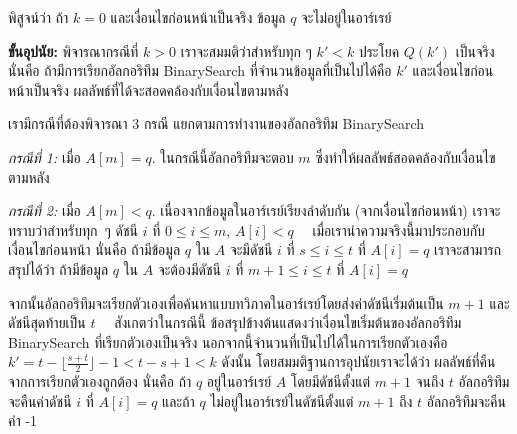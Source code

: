 \begin{quiz}{}
\label{quiz:rec-bin-basis}
พิสูจน์{\wbr}ว่า ถ้า $k=0$ และ{\wbr}เงื่อนไข{\wbr}ก่อนหน้า{\wbr}เป็นจริง ข้อมูล $q$ จะ{\wbr}ไม่{\wbr}อยู่{\wbr}ใน{\wbr}อาร์เรย์
\end{quiz}

{\bf ขั้น{\wbr}อุปนัย:} พิจารณา{\wbr}กรณี{\wbr}ที่ $k>0$ เรา{\wbr}จะ{\wbr}สมมติ{\wbr}ว่า{\wbr}สำหรับ{\wbr}ทุก ๆ $k'<k$ ประโยค{\wbr}
$Q(k')$ เป็นจริง นั่น{\wbr}คือ ถ้า{\wbr}มี{\wbr}การ{\wbr}เรียก{\wbr}อัล{\wbr}กอ{\wbr}ริ{\wbr}ทึม BinarySearch
ที่{\wbr}จำนวน{\wbr}ข้อมูล{\wbr}ที่{\wbr}เป็น{\wbr}ไป{\wbr}ได้{\wbr}คือ $k'$ และ{\wbr}เงื่อนไข{\wbr}ก่อนหน้า{\wbr}เป็นจริง{\wbr}
ผลลัพธ์{\wbr}ที่{\wbr}ได้{\wbr}จะ{\wbr}สอดคล้อง{\wbr}กับ{\wbr}เงื่อนไข{\wbr}ตาม{\wbr}หลัง{\wbr}

เรา{\wbr}มี{\wbr}กรณี{\wbr}ที่{\wbr}ต้อง{\wbr}พิจารณา 3 กรณี แยก{\wbr}ตาม{\wbr}การ{\wbr}ทำงาน{\wbr}ของ{\wbr}อัล{\wbr}กอ{\wbr}ริ{\wbr}ทึม BinarySearch

{\em กรณี{\wbr}ที่ 1:} เมื่อ $A[m]=q$. ใน{\wbr}กรณี{\wbr}นี้{\wbr}อัล{\wbr}กอ{\wbr}ริ{\wbr}ทึม{\wbr}จะ{\wbr}ตอบ $m$
ซึ่ง{\wbr}ทำ{\wbr}ให้{\wbr}ผลลัพธ์{\wbr}สอดคล้อง{\wbr}กับ{\wbr}เงื่อนไข{\wbr}ตาม{\wbr}หลัง{\wbr}

{\em กรณี{\wbr}ที่ 2:} เมื่อ $A[m]<q$. เนื่องจาก{\wbr}ข้อมูล{\wbr}ใน{\wbr}อาร์เรย์{\wbr}เรียงลำดับ{\wbr}กัน{\wbr}
(จาก{\wbr}เงื่อนไข{\wbr}ก่อนหน้า) เรา{\wbr}จะ{\wbr}ทราบ{\wbr}ว่า{\wbr}สำหรับ{\wbr}ทุก~ๆ ดัชนี $i$ ที่ $0\leq i\leq m$,
$A[i]<q$ \ \ เมื่อ{\wbr}เรา{\wbr}นำ{\wbr}ความจริง{\wbr}นี้{\wbr}มา{\wbr}ประกอบ{\wbr}กับ{\wbr}เงื่อนไข{\wbr}ก่อนหน้า นั่น{\wbr}คือ ถ้า{\wbr}มี{\wbr}ข้อมูล $q$
ใน $A$ จะ{\wbr}มี{\wbr}ดัชนี $i$ ที่ $s\leq i\leq t$ ที่ $A[i]=q$ เรา{\wbr}จะ{\wbr}สามารถ{\wbr}สรุป{\wbr}ได้{\wbr}ว่า{\wbr}
ถ้า{\wbr}มี{\wbr}ข้อมูล $q$ ใน $A$ จะ{\wbr}ต้อง{\wbr}มี{\wbr}ดัชนี $i$ ที่ $m+1\leq i\leq t$ ที่ $A[i]=q$

จากนั้น{\wbr}อัล{\wbr}กอ{\wbr}ริ{\wbr}ทึม{\wbr}จะ{\wbr}เรียก{\wbr}ตัวเอง{\wbr}เพื่อ{\wbr}ค้นหา{\wbr}แบบ{\wbr}ทวิภาค{\wbr}ใน{\wbr}อาร์เรย์{\wbr}โดย{\wbr}ส่ง{\wbr}ค่า{\wbr}ดัชนี{\wbr}เริ่มต้น{\wbr}เป็น $m+1$
และ{\wbr}ดัชนี{\wbr}สุดท้าย{\wbr}เป็น $t$ \ \ สังเกต{\wbr}ว่า{\wbr}ใน{\wbr}กรณี{\wbr}นี้{\wbr}
ข้อสรุป{\wbr}ข้างต้น{\wbr}แสดง{\wbr}ว่า{\wbr}เงื่อนไข{\wbr}เริ่มต้น{\wbr}ของ{\wbr}อัล{\wbr}กอ{\wbr}ริ{\wbr}ทึม BinarySearch ที่{\wbr}เรียก{\wbr}ตัวเอง{\wbr}เป็นจริง{\wbr}
นอกจากนี้{\wbr}จำนวน{\wbr}ที่{\wbr}เป็น{\wbr}ไป{\wbr}ได้{\wbr}ใน{\wbr}การ{\wbr}เรียก{\wbr}ตัวเอง{\wbr}คือ $k' = t -
\lfloor\frac{s+t}{2}\rfloor - 1 < t - s + 1<k$ ดังนั้น{\wbr}
โดย{\wbr}สมมติฐาน{\wbr}การ{\wbr}อุปนัย{\wbr}เรา{\wbr}จะ{\wbr}ได้{\wbr}ว่า ผลลัพธ์{\wbr}ที่{\wbr}คืน{\wbr}จาก{\wbr}การ{\wbr}เรียก{\wbr}ตัวเอง{\wbr}ถูกต้อง นั่น{\wbr}คือ ถ้า $q$
อยู่{\wbr}ใน{\wbr}อาร์เรย์ $A$ โดย{\wbr}มี{\wbr}ดัชนี{\wbr}ตั้งแต่ $m+1$ จนถึง $t$ อัล{\wbr}กอ{\wbr}ริ{\wbr}ทึม{\wbr}จะ{\wbr}คืน{\wbr}ค่า{\wbr}ดัชนี $i$ ที่{\wbr}
$A[i]=q$ และ{\wbr}ถ้า $q$ ไม่{\wbr}อยู่{\wbr}ใน{\wbr}อาร์เรย์{\wbr}ใน{\wbr}ดัชนี{\wbr}ตั้งแต่ $m+1$ ถึง $t$ อัล{\wbr}กอ{\wbr}ริ{\wbr}ทึม{\wbr}จะ{\wbr}คืน{\wbr}ค่า -1

